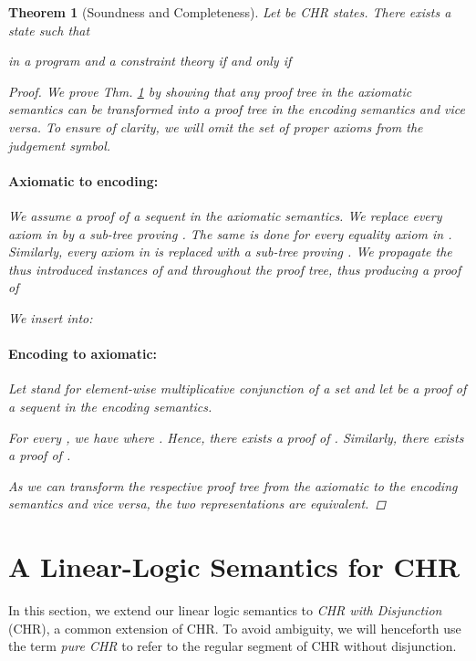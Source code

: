 \documentclass[acmtocl]{acmtrans2m}
\newtheorem{theorem}{Theorem}[section]
\begin{document}
\begin{theorem}[Soundness and Completeness]
  \label{theorem:embed_soundness_completeness}
  Let  be CHR states. There exists a state  such that
  
  in a program  and a constraint theory  \emph{if and only if}
  
\begin{proof}
  We prove Thm. \ref{theorem:embed_soundness_completeness} by showing that any
  proof tree in the axiomatic semantics can be transformed into a proof tree in
  the encoding semantics and vice versa. To ensure of clarity, we will omit
  the set of proper axioms from the judgement symbol.

  \paragraph*{Axiomatic to encoding:} We assume a proof  of a sequent
   in the axiomatic semantics. We replace
  every axiom  in  by a sub-tree proving
  . The same is done for every
  equality axiom in . Similarly, every axiom  in  is replaced with a
  sub-tree proving . We propagate the thus
  introduced instances of  and  throughout the proof tree, thus
  producing a proof  of
  
  We insert  into:
  

  \paragraph*{Encoding to axiomatic:} Let  stand for element-wise
  multiplicative conjunction of a set and let  be a proof of a sequent
   in the encoding semantics.

  For every , we
  have  where
  . Hence, there exists a proof  of
  . Similarly, there exists a proof 
  of .

  

As we can transform the respective proof tree from the axiomatic to the
encoding semantics and vice versa, the two representations are equivalent.
\end{proof}
\end{theorem}



\section{A Linear-Logic Semantics for CHR}
  \label{sec:chrv}

In this section, we extend our linear logic semantics to \emph{CHR with
Disjunction} (CHR), a common extension of CHR. To avoid ambiguity, we
will henceforth use the term \emph{pure CHR} to refer to the regular segment of
CHR without disjunction.
\end{document}
